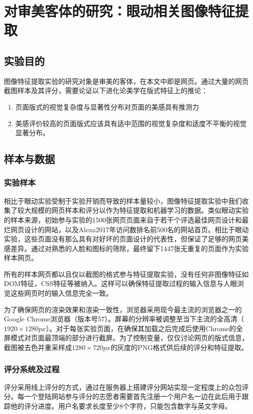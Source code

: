 \chapter{对审美客体的研究：眼动相关图像特征提取}
\label{chap:exp2}

\section{实验目的}
图像特征提取实验的研究对象是审美的客体，在本文中即是网页。通过大量的网页截图样本及其评分，需要论证以下进化论美学在版式特征上的推论：

\begin{enumerate}
  \item 页面版式的视觉复杂度与显著性分布对页面的美感具有推测力
  \item 美感评价较高的页面版式应该具有适中范围的视觉复杂度和适度不平衡的视觉显著分布。
\end{enumerate}

\section{样本与数据}
\subsection{实验样本}
相比于眼动实验受制于实验开销而导致的样本量较小，图像特征提取实验中我们收集了较大规模的网页样本和评分以作为特征提取和机器学习的数据。类似眼动实验的样本来源，初始参与实验的1500张网页页面来自于若干个评选最佳网页设计和最烂网页设计的网站，以及Alexa2017年访问数排名前500名的网站首页。相比于眼动实验，这些页面没有那么具有对好坏的页面设计的代表性，但保证了足够的网页美感差异。通过对熟悉的人脸和图标的筛除，最终留下1447张无重复的页面作为实验样本网页。

所有的样本网页都以且仅以截图的格式参与特征提取实验，没有任何非图像特征如DOM特征，CSS特征等被纳入。这样可以确保特征提取过程的输入信息与人眼浏览这些网页时的输入信息完全一致。

为了确保网页的渲染效果和渲染一致性，浏览器采用现今最主流的浏览器之一的Google Chrome浏览器（版本号57）。屏幕的分辨率被调整至当下主流的全高清（$1920\times1280px$）。对于每张实验页面，在确保其加载之后完成后使用Chrome的全屏模式对页面最顶端的部分进行截屏。为了控制变量，仅仅讨论网页的版式信息，截图被去色并重采样成$1280\times720px$的灰度的PNG格式供后续的评分和特征提取。

\subsection{评分系统及过程}
评分采用线上评分的方式，通过在服务器上搭建评分网站实现一定程度上的众包评分。每一个登陆网站参与评分的志愿者需要首先注册一个用户名一边在此后用于跟踪他的评分进度。用户名要求长度至少8个字符，只能包含数字与英文字母。

